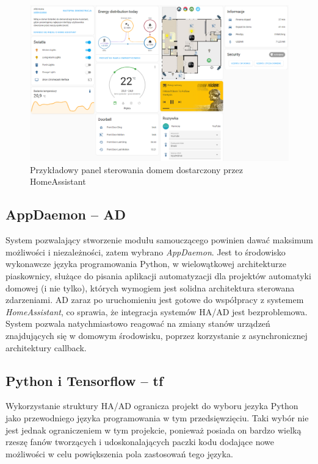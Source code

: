 \begin{figure}
    \centering\includegraphics[width=1.00\textwidth]{img/ha_dashboard.png}
    \caption{Przykładowy panel sterowania domem dostarczony przez HomeAssistant} \label{fig:dashboard_example}
\end{figure}


\subsection{AppDaemon -- AD}
System pozwalający stworzenie modułu samouczącego powinien dawać maksimum możliwości i niezależności, zatem wybrano \textit{AppDaemon}. Jest to środowisko wykonawcze języka programowania Python, w wielowątkowej architekturze piaskownicy, służące do pisania aplikacji automatyzacji dla projektów automatyki domowej (i nie tylko), których wymogiem jest solidna architektura sterowana zdarzeniami. AD zaraz po uruchomieniu jest gotowe do współpracy z systemem \textit{HomeAssistant}, co sprawia, że integracja systemów HA/AD jest bezproblemowa. System pozwala natychmiastowo reagować na zmiany stanów urządzeń znajdujących się w domowym środowisku, poprzez korzystanie z asynchronicznej architektury callback.

\subsection{Python i Tensorflow -- tf}
Wykorzystanie struktury HA/AD ogranicza projekt do wyboru jezyka Python jako przewodniego języka programowania w tym przedsięwzięciu. Taki wybór nie jest jednak ograniczeniem w tym projekcie, ponieważ posiada on bardzo wielką rzeszę fanów tworzących i udoskonalających paczki kodu dodające nowe możliwości w celu powiększenia pola zastosowań tego języka.

